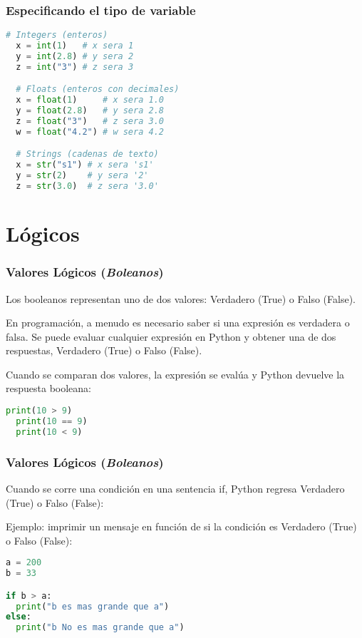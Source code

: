 \begin{frame}[fragile]
  \frametitle{Especificando el tipo de variable}
  \begin{lstlisting}[language=Python]
  # Integers (enteros)
  x = int(1)   # x sera 1
  y = int(2.8) # y sera 2
  z = int("3") # z sera 3

  # Floats (enteros con decimales)
  x = float(1)     # x sera 1.0
  y = float(2.8)   # y sera 2.8
  z = float("3")   # z sera 3.0
  w = float("4.2") # w sera 4.2

  # Strings (cadenas de texto)
  x = str("s1") # x sera 's1'
  y = str(2)    # y sera '2'
  z = str(3.0)  # z sera '3.0'
  \end{lstlisting}
\end{frame}

\section{Lógicos}

\begin{frame}[fragile]
  \frametitle{Valores Lógicos (\emph{Boleanos})}
  Los booleanos representan uno de dos valores: Verdadero
  (\textcolor{codeKeyword2}{True}) o Falso
  (\textcolor{codeKeyword2}{False}).

  \pausa
  \vspace{\baselineskip}
  En programación, a menudo es necesario saber si una expresión es verdadera
  o falsa. Se puede evaluar cualquier expresión en Python y obtener una de
  dos respuestas, Verdadero (\textcolor{codeKeyword2}{True})
  o Falso (\textcolor{codeKeyword2}{False}).

  \pausa
  \vspace{\baselineskip}
  Cuando se comparan dos valores, la expresión se evalúa y Python
  devuelve la respuesta booleana: 

  \begin{lstlisting}[language=Python]
  print(10 > 9)
  print(10 == 9)
  print(10 < 9)
  \end{lstlisting}
\end{frame}

\begin{frame}[fragile]
  \frametitle{Valores Lógicos (\emph{Boleanos})}

  Cuando se corre una condición en una sentencia
  \textcolor{codeKeyword}{if}, Python regresa Verdadero
  (\textcolor{codeKeyword2}{True}) o Falso
  (\textcolor{codeKeyword2}{False}):

  \vspace{\baselineskip}
  Ejemplo: imprimir un mensaje en función de si la condición es Verdadero
  (\textcolor{codeKeyword2}{True}) o Falso
  (\textcolor{codeKeyword2}{False}):
  \begin{lstlisting}[language=Python]
a = 200
b = 33

if b > a:
  print("b es mas grande que a")
else:
  print("b No es mas grande que a") 
  \end{lstlisting}
\end{frame}

